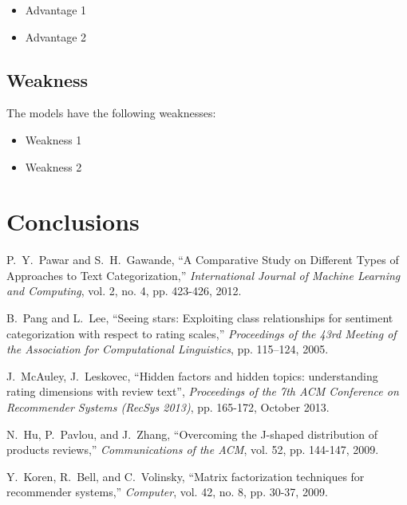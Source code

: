 \documentclass[12pt,a4paper]{article}
\begin{document}
\begin{spacing}{1.2}
\begin{itemize}
\item Advantage 1

\item Advantage 2
\end{itemize}


\subsection{Weakness}

The models have the following weaknesses:

\begin{itemize}
\item Weakness 1

\item Weakness 2
\end{itemize}


\section{Conclusions}
\label{Conclusions}






\newpage
\begin{thebibliography}{00}


P.~Y.~Pawar and S.~H.~Gawande, ``A Comparative Study on Different Types of Approaches to Text Categorization,'' \textit{International Journal of Machine Learning and Computing}, vol. 2, no. 4, pp. 423-426, 2012.

B.~Pang and L.~Lee, ``Seeing stars: Exploiting class relationships for sentiment categorization with respect to rating scales,'' \textit{Proceedings of the 43rd Meeting of the Association for Computational Linguistics}, pp. 115–124, 2005.

J.~McAuley, J.~Leskovec, ``Hidden factors and hidden topics: understanding rating dimensions with review text'', \textit{Proceedings of the 7th ACM Conference on Recommender Systems (RecSys 2013)}, pp. 165-172, October 2013.

N.~Hu, P.~Pavlou, and J.~Zhang, ``Overcoming the J-shaped distribution of products reviews,'' \textit{Communications of the ACM}, vol. 52, pp. 144-147, 2009. 

Y.~Koren, R.~Bell, and C.~Volinsky, ``Matrix factorization techniques for recommender systems,'' \textit{Computer}, vol. 42, no. 8, pp. 30-37, 2009.


\end{thebibliography}
\end{spacing}
\end{document}
